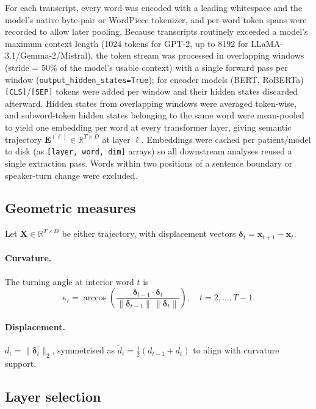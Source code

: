 For each transcript, every word was encoded with a leading whitespace and the
model's native byte-pair or WordPiece tokenizer, and per-word token spans were
recorded to allow later pooling. Because transcripts routinely exceeded a
model's maximum context length (1024 tokens for GPT-2, up to 8192 for
LLaMA-3.1/Gemma-2/Mistral), the token stream was processed in overlapping
windows (stride = 50\% of the model's usable context) with a single forward
pass per window (\texttt{output\_hidden\_states=True}); for encoder models
(BERT, RoBERTa) \texttt{[CLS]}/\texttt{[SEP]} tokens were added per window and
their hidden states discarded afterward. Hidden states from overlapping
windows were averaged token-wise, and subword-token hidden states belonging to
the same word were mean-pooled to yield one embedding per word at every
transformer layer, giving semantic trajectory
$\mathbf{E}^{(\ell)}\!\in\!\mathbb{R}^{T\times D}$ at layer $\ell$. Embeddings
were cached per patient/model to disk (as \texttt{[layer, word, dim]} arrays)
so all downstream analyses reused a single extraction pass.
Words within two positions of a sentence boundary or speaker-turn change were
excluded.

\subsection*{Geometric measures}

Let $\mathbf{X}\in\mathbb{R}^{T\times D}$ be either trajectory, with
displacement vectors $\boldsymbol{\delta}_t = \mathbf{x}_{t+1}-\mathbf{x}_t$.

\paragraph{Curvature.}
The turning angle at interior word $t$ is
\begin{equation}
  \kappa_t = \arccos\!\left(
    \frac{\boldsymbol{\delta}_{t-1}\cdot\boldsymbol{\delta}_t}
         {\|\boldsymbol{\delta}_{t-1}\|\,\|\boldsymbol{\delta}_t\|}
  \right), \quad t=2,\dots,T-1.
  \label{eq:curv}
\end{equation}

\paragraph{Displacement.}
$d_t = \|\boldsymbol{\delta}_t\|_2$, symmetrised as
$\tilde{d}_t = \tfrac{1}{2}(d_{t-1}+d_t)$ to align with curvature support.

\subsection*{Layer selection}

